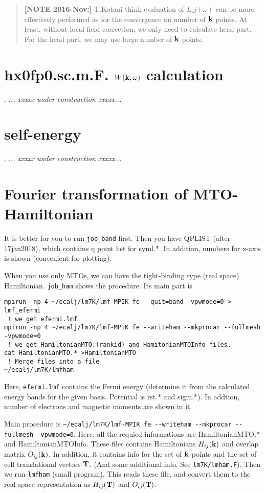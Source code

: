 \documentclass[a4paper,10pt,fleqn]{article}
\def\underconstruction{{\it... xxxxx under construction xxxxx...\\}}
\newcommand{\bfk}{{\bf k}}
\newcommand{\bfT}{{\bf T}}
\begin{document}
\begin{quote}
{\noindent \bf [NOTE 2016-Nov:]}
T.Kotani think evaluation of $L_ij(\omega)$ can be more effectively
performed as for the convergence on number of $\bfk$ points.
At least, without local field correction, we only need to calculate head part.
For the head part, we may use large number of $\bfk$ points.
\end{quote}


\section{hx0fp0.sc.m.F. $W(\bfk,\omega)$ calculation}.
\underconstruction


\section{self-energy}.
\underconstruction

\section{Fourier transformation of MTO-Hamiltonian}
It is better for you to run \verb#job_band# first. 
Then you have QPLIST (after 17jan2018), which contains q point list for
syml.*. In addition, numbers for x-axis is shown (convenient for plotting).

When you use only MTOs, we can have the tight-binding type (real
space) Hamiltonian. \verb#job_ham# shows the procedure.
Its main part is
\begin{verbatim}
mpirun -np 4 ~/ecalj/lm7K/lmf-MPIK fe --quit=band -vpwmode=0 > lmf_efermi
 ! we get efermi.lmf
mpirun -np 4 ~/ecalj/lm7K/lmf-MPIK fe --writeham --mkprocar --fullmesh -vpwmode=0
 ! we get HamiltonianMTO.(rankid) and HamitonianMTOInfo files.
cat HamiltonianMTO.* >HamiltonianMTO
 ! Merge files into a file 
~/ecalj/lm7K/lmfham
\end{verbatim}
Here, \verb#efermi.lmf# contains the Fermi energy (determine it from the
calculated energy bands for the given basis. Potential is rst.* and sigm.*).
In addtion, number of electrons and magnetic moments are shown in it.

Main procedure is
\verb#~/ecalj/lm7K/lmf-MPIK fe --writeham --mkprocar --fullmesh -vpwmode=0#.
Here, all the requied informations are  HamiltonianMTO.* and
HamiltonianMTOInfo. These files contains Hamiltonians $H_{ij}(\bfk)$ and
overlap matrix $O_{ij}(\bfk)$. In addition, it contains info for the set
of $\bfk$ points and the set of cell translational vectors $\bfT$.
(And some additional info. See \verb#lm7K/lmham.F#). 
Then we run \verb#lmfham# (small program). This reads these file, and
convert them to the real space representation as 
$H_{ij}(\bfT)$ and $O_{ij}(\bfT)$. 
\end{document}
